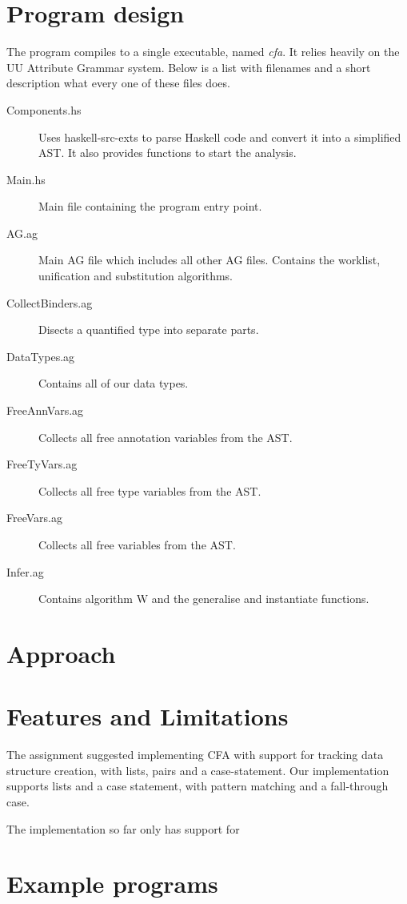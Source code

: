 \documentclass[a4paper]{article}
\begin{document}
\section{Program design}
The program compiles to a single executable, named \emph{cfa}. It relies heavily
on the UU Attribute Grammar system. Below is a list with filenames and a short
description what every one of these files does.

\begin{description}
\item [Components.hs] Uses haskell-src-exts to parse Haskell code and convert
it into a simplified AST. It also provides functions to start the analysis.
\item [Main.hs] Main file containing the program entry point.
\item [AG.ag] Main AG file which includes all other AG files. Contains the worklist,
unification and substitution algorithms.
\item [CollectBinders.ag] Disects a quantified type into separate parts.
\item [DataTypes.ag] Contains all of our data types.
\item [FreeAnnVars.ag] Collects all free annotation variables from the AST.
\item [FreeTyVars.ag] Collects all free type variables from the AST.
\item [FreeVars.ag] Collects all free variables from the AST.
\item [Infer.ag] Contains algorithm W and the generalise and instantiate functions.
\end{description}

\section{Approach}


\section{Features and Limitations}

The assignment suggested implementing CFA with support for tracking data structure 
creation, with lists, pairs and a case-statement. Our implementation supports lists and 
a case statement, with pattern matching and a fall-through case. 

The implementation so far only has support for 

\section{Example programs}
\end{document}

